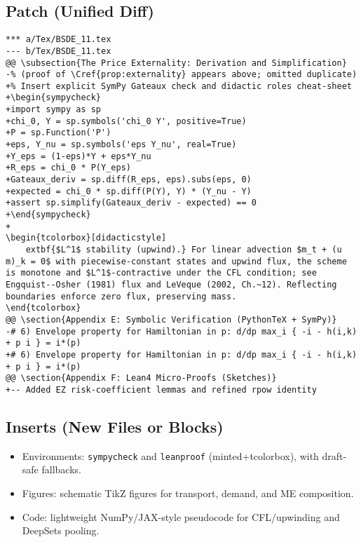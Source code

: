 ﻿\documentclass[11pt,letterpaper,oneside]{article}
\numberwithin{equation}{section}
\newenvironment{sympycheck}
  {\begin{tcolorbox}[sympycheckstyle]\VerbatimEnvironment\begin{verbatim}}
  {\end{verbatim}\end{tcolorbox}}
\renewenvironment{sympycheck}{\VerbatimEnvironment\begin{tcolorbox}[sympycheckstyle]\begin{Verbatim}[fontsize=\small]}{\end{Verbatim}\end{tcolorbox}}
\newcommand{\1}{\mathbf{1}}
\begin{document}
\subsection*{Patch (Unified Diff)}
\begin{tcolorbox}[sympycheckstyle,title={Representative Unified Diff (excerpt)}]
\begin{Verbatim}[fontsize=\small]
*** a/Tex/BSDE_11.tex
--- b/Tex/BSDE_11.tex
@@ \subsection{The Price Externality: Derivation and Simplification}
-% (proof of \Cref{prop:externality} appears above; omitted duplicate)
+% Insert explicit SymPy Gateaux check and didactic roles cheat-sheet
+\begin{sympycheck}
+import sympy as sp
+chi_0, Y = sp.symbols('chi_0 Y', positive=True)
+P = sp.Function('P')
+eps, Y_nu = sp.symbols('eps Y_nu', real=True)
+Y_eps = (1-eps)*Y + eps*Y_nu
+R_eps = chi_0 * P(Y_eps)
+Gateaux_deriv = sp.diff(R_eps, eps).subs(eps, 0)
+expected = chi_0 * sp.diff(P(Y), Y) * (Y_nu - Y)
+assert sp.simplify(Gateaux_deriv - expected) == 0
+\end{sympycheck}
+
\begin{tcolorbox}[didacticstyle]
  	extbf{$L^1$ stability (upwind).} For linear advection $m_t + (u m)_k = 0$ with piecewise-constant states and upwind flux, the scheme is monotone and $L^1$-contractive under the CFL condition; see Engquist--Osher (1981) flux and LeVeque (2002, Ch.~12). Reflecting boundaries enforce zero flux, preserving mass.
\end{tcolorbox}
@@ \section{Appendix E: Symbolic Verification (PythonTeX + SymPy)}
-# 6) Envelope property for Hamiltonian in p: d/dp max_i { -i - h(i,k) + p i } = i*(p)
+# 6) Envelope property for Hamiltonian in p: d/dp max_i { -i - h(i,k) + p i } = i*(p)
@@ \section{Appendix F: Lean4 Micro-Proofs (Sketches)}
+-- Added EZ risk-coefficient lemmas and refined rpow identity
\end{Verbatim}
\end{tcolorbox}

\subsection*{Inserts (New Files or Blocks)}
\begin{itemize}[leftmargin=1.2em]
  \item Environments: \texttt{sympycheck} and \texttt{leanproof} (minted+tcolorbox), with draft-safe fallbacks.
  \item Figures: schematic TikZ figures for transport, demand, and ME composition.
  \item Code: lightweight NumPy/JAX-style pseudocode for CFL/upwinding and DeepSets pooling.
\end{itemize}
\end{document}

